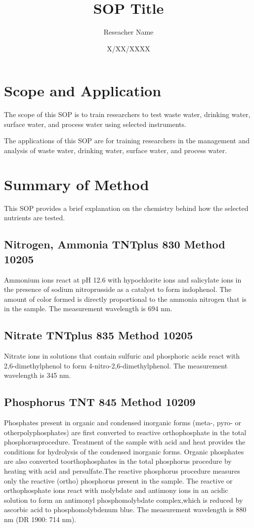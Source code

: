 \documentclass[12pt]{../SOP4_alpha}\usepackage[]{graphicx}\usepackage[]{xcolor}
\title{SOP Title}
\date{X/XX/XXXX}
\author{Reseacher Name}
\begin{document}
\maketitle

\section{Scope and Application}

\NP The scope of this SOP is to train researchers to test waste water, drinking water, surface water, and process water using selected instruments.

\NP The applications of this SOP are for training researchers in the management and analysis of waste water, drinking water, surface water, and process water.

\section{Summary of Method}
\NP This SOP provides a brief explanation on the chemistry behind how the selected nutrients are tested.
\subsection {Nitrogen, Ammonia TNTplus 830 Method 10205}
\NP Ammonium ions react at pH 12.6 with hypochlorite ions and salicylate ions in the
presence of sodium nitroprusside as a catalyst to form indophenol. The amount of color
formed is directly proportional to the ammonia nitrogen that is in the sample. The
measurement wavelength is 694 nm.
\subsection {Nitrate TNTplus 835 Method 10205}
\NP Nitrate ions in solutions that contain sulfuric and phosphoric acids react with  2,6-dimethylphenol to form 4-nitro-2,6-dimethylphenol. The measurement wavelength is
345 nm.
\subsection{Phosphorus TNT 845 Method 10209}
\NP Phosphates present in organic and condensed inorganic forms (meta-, pyro- or otherpolyphosphates) are first converted to reactive orthophosphate in the total phosphorusprocedure. Treatment of the sample with acid and heat provides the conditions for hydrolysis of the condensed inorganic forms. Organic phosphates are also converted toorthophosphates in the total phosphorus procedure by heating with acid and persulfate.The reactive phosphorus procedure measures only the reactive (ortho) phosphorus present in the sample. The reactive or orthophosphate ions react with molybdate and antimony ions in an acidic solution to form an antimonyl phosphomolybdate complex,which is reduced by ascorbic acid to phosphomolybdenum blue. The measurement wavelength is 880 nm (DR 1900: 714 nm).
\end{document}
